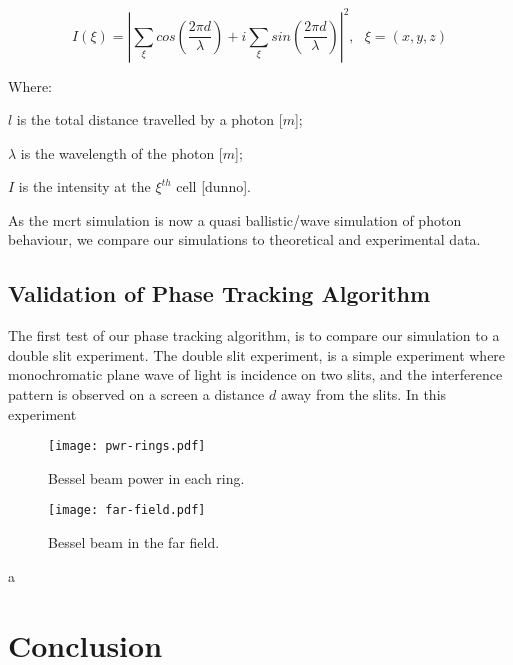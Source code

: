 \begin{equation}
I(\xi)=\left| \sum\limits_{\xi}cos\left(\frac{2\pi d}{\lambda}\right) + i \sum\limits_{\xi}sin\left(\frac{2\pi d}{\lambda}\right)\right|^2,\ \ \ \xi=(x,y,z)
\label{eqn:intense}
\end{equation}

\noindent Where:

\indent $l$ is the total distance travelled by a photon [$m$];

\indent $\lambda$ is the wavelength of the photon [$m$];

\indent $I$ is the intensity at the $\xi^{th}$ cell [dunno].

\medskip

As the \gls{mcrt} simulation is now a quasi ballistic/wave simulation of photon behaviour, we compare our simulations to theoretical and experimental data.

\subsection{Validation of Phase Tracking Algorithm}

The first test of our phase tracking algorithm, is to compare our simulation to a double slit experiment.
The double slit experiment, is a simple experiment where monochromatic plane wave of light is incidence on two slits, and the interference pattern is observed on a screen a distance $d$ away from the slits.
In this experiment


\begin{figure}
\centering
\texttt{[image: pwr-rings.pdf]}
\caption{Bessel beam power in each ring.}
\label{fig:pwrring}
\end{figure}

\begin{figure}
\centering
\texttt{[image: far-field.pdf]}
\caption{Bessel beam in the far field.}
\label{fig:farfield}
\end{figure}


a~\cite{mignon2016fractional}
\section{Conclusion}